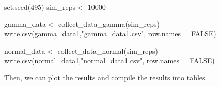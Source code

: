 \documentclass[12pt]{article}
\newenvironment{Shaded}{\begin{snugshade}}{\end{snugshade}}
\newcommand{\AttributeTok}[1]{\textcolor[rgb]{0.77,0.63,0.00}{#1}}
\newcommand{\ConstantTok}[1]{\textcolor[rgb]{0.00,0.00,0.00}{#1}}
\newcommand{\DecValTok}[1]{\textcolor[rgb]{0.00,0.00,0.81}{#1}}
\newcommand{\FunctionTok}[1]{\textcolor[rgb]{0.00,0.00,0.00}{#1}}
\newcommand{\NormalTok}[1]{#1}
\newcommand{\OtherTok}[1]{\textcolor[rgb]{0.56,0.35,0.01}{#1}}
\newcommand{\StringTok}[1]{\textcolor[rgb]{0.31,0.60,0.02}{#1}}
\begin{document}
\begin{Shaded}
\begin{Highlighting}[]
\FunctionTok{set.seed}\NormalTok{(}\DecValTok{495}\NormalTok{)}
\NormalTok{sim\_reps }\OtherTok{\textless{}{-}} \DecValTok{10000}

\NormalTok{gamma\_data }\OtherTok{\textless{}{-}} \FunctionTok{collect\_data\_gamma}\NormalTok{(sim\_reps)}
\FunctionTok{write.csv}\NormalTok{(gamma\_data1,}\StringTok{"gamma\_data1.csv"}\NormalTok{, }\AttributeTok{row.names =} \ConstantTok{FALSE}\NormalTok{)}

\NormalTok{normal\_data }\OtherTok{\textless{}{-}} \FunctionTok{collect\_data\_normal}\NormalTok{(sim\_reps)}
\FunctionTok{write.csv}\NormalTok{(normal\_data1,}\StringTok{"normal\_data1.csv"}\NormalTok{, }\AttributeTok{row.names =} \ConstantTok{FALSE}\NormalTok{)}
\end{Highlighting}
\end{Shaded}

Then, we can plot the results and compile the results into tables.
\end{document}
